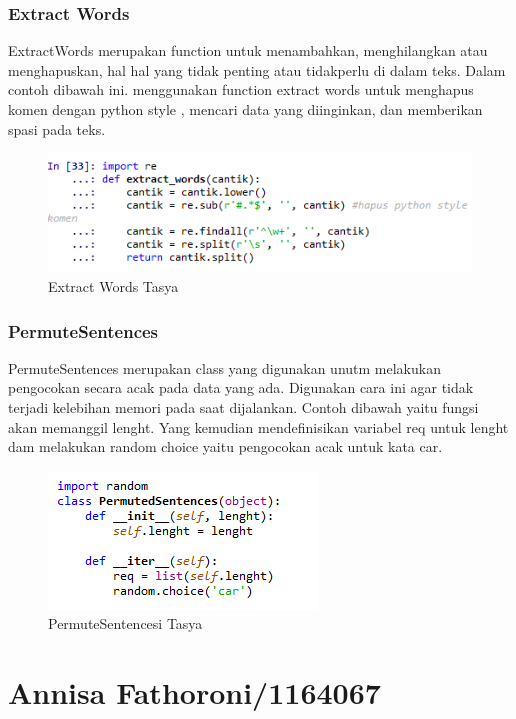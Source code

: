 \subsubsection{Extract Words}
ExtractWords merupakan function untuk menambahkan, menghilangkan atau menghapuskan, hal hal yang tidak penting atau tidakperlu di dalam teks. Dalam contoh dibawah ini. menggunakan function extract words untuk menghapus komen dengan python style , mencari data yang diinginkan, dan memberikan spasi pada teks.
\begin{figure}[ht]
\centering
\includegraphics[scale=0.3]{figures/chapter5tasya15.png}
\caption{Extract Words Tasya}
\label{Praktek}
\end{figure}

\subsubsection{PermuteSentences}
PermuteSentences merupakan class yang digunakan unutm melakukan pengocokan secara acak pada data yang ada. Digunakan cara ini agar tidak terjadi kelebihan memori pada saat dijalankan. Contoh dibawah yaitu fungsi akan memanggil lenght. Yang kemudian mendefinisikan variabel req untuk lenght dam melakukan random choice yaitu pengocokan acak untuk kata car.
\begin{figure}[ht]
\centering
\includegraphics[scale=0.3]{figures/chapter5tasya16.png}
\caption{PermuteSentencesi Tasya}
\label{Praktek}
\end{figure}

\section{Annisa Fathoroni/1164067}
